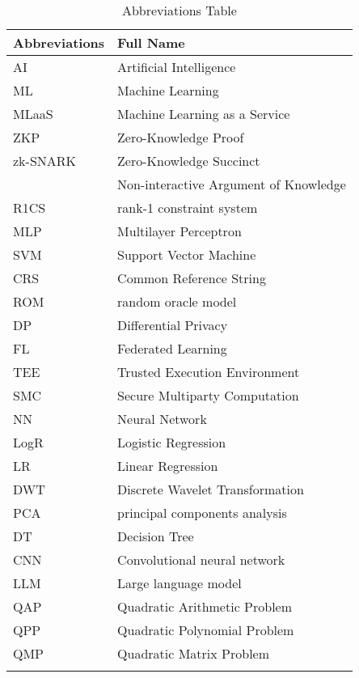 \documentclass[journal]{IEEEtran}
\begin{document}
\begin{table}[t]
    \centering
    \renewcommand{\arraystretch}{1.3} %
    \setlength{\tabcolsep}{10pt} %
    \caption{ Abbreviations Table}

    \begin{tabular}{l l}
        \hline
        \textbf{Abbreviations} & \textbf{Full Name} \\ \hline
        AI & Artificial Intelligence \\
        ML & Machine Learning \\
        MLaaS & Machine Learning as a Service \\
        ZKP & Zero-Knowledge Proof \\
        zk-SNARK & Zero-Knowledge Succinct \\
        &Non-interactive Argument of Knowledge \\
        R1CS & rank-1 constraint system \\
        MLP & Multilayer Perceptron \\
        SVM & Support Vector Machine \\
        CRS & Common Reference String \\
        ROM & random oracle model \\
        DP & Differential Privacy \\
        FL & Federated Learning \\
        TEE & Trusted Execution Environment \\
        SMC & Secure Multiparty Computation \\
        NN & Neural Network \\
        LogR & Logistic Regression \\
        LR & Linear Regression \\
        DWT & Discrete Wavelet Transformation \\
        PCA & principal components analysis \\
        DT & Decision Tree \\
        CNN & Convolutional neural network \\
        LLM & Large language model \\
        QAP & Quadratic Arithmetic Problem \\
        QPP & Quadratic Polynomial Problem \\
        QMP & Quadratic Matrix Problem \\
        \hline\\
    \end{tabular}
    \label{tab1}
\vspace{-15pt}
\end{table}
\end{document}
